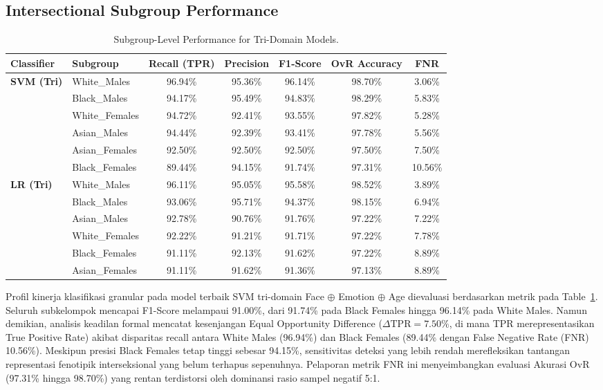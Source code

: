 \subsection{Intersectional Subgroup Performance}
\label{sec:subgroup_performance}

\begin{table}[htbp]
\caption{Subgroup-Level Performance for Tri-Domain Models.}
\label{tab:XI}
\centering
\begin{tabular}{llccccc}
\toprule
Classifier & Subgroup & Recall (TPR) & Precision & F1-Score & OvR Accuracy & FNR \\
\midrule
\multirow{6}{*}{\textbf{SVM (Tri)}} & White\_Males & 96.94\% & 95.36\% & 96.14\% & 98.70\% & 3.06\% \\
 & Black\_Males & 94.17\% & 95.49\% & 94.83\% & 98.29\% & 5.83\% \\
 & White\_Females & 94.72\% & 92.41\% & 93.55\% & 97.82\% & 5.28\% \\
 & Asian\_Males & 94.44\% & 92.39\% & 93.41\% & 97.78\% & 5.56\% \\
 & Asian\_Females & 92.50\% & 92.50\% & 92.50\% & 97.50\% & 7.50\% \\
 & Black\_Females & 89.44\% & 94.15\% & 91.74\% & 97.31\% & 10.56\% \\
\midrule
\multirow{6}{*}{\textbf{LR (Tri)}} & White\_Males & 96.11\% & 95.05\% & 95.58\% & 98.52\% & 3.89\% \\
 & Black\_Males & 93.06\% & 95.71\% & 94.37\% & 98.15\% & 6.94\% \\
 & Asian\_Males & 92.78\% & 90.76\% & 91.76\% & 97.22\% & 7.22\% \\
 & White\_Females & 92.22\% & 91.21\% & 91.71\% & 97.22\% & 7.78\% \\
 & Black\_Females & 91.11\% & 92.13\% & 91.62\% & 97.22\% & 8.89\% \\
 & Asian\_Females & 91.11\% & 91.62\% & 91.36\% & 97.13\% & 8.89\% \\
\bottomrule
\end{tabular}
\end{table}

Profil kinerja klasifikasi granular pada model terbaik SVM tri-domain Face $\oplus$ Emotion $\oplus$ Age dievaluasi berdasarkan metrik pada Table~\ref{tab:XI}. Seluruh subkelompok mencapai F1-Score melampaui 91.00\%, dari 91.74\% pada Black Females hingga 96.14\% pada White Males. Namun demikian, analisis keadilan formal mencatat kesenjangan Equal Opportunity Difference ($\Delta\text{TPR} = 7.50\%$, di mana TPR merepresentasikan True Positive Rate) akibat disparitas recall antara White Males (96.94\%) dan Black Females (89.44\% dengan False Negative Rate (FNR) 10.56\%). Meskipun presisi Black Females tetap tinggi sebesar 94.15\%, sensitivitas deteksi yang lebih rendah merefleksikan tantangan representasi fenotipik interseksional yang belum terhapus sepenuhnya. Pelaporan metrik FNR ini menyeimbangkan evaluasi Akurasi OvR (97.31\% hingga 98.70\%) yang rentan terdistorsi oleh dominansi rasio sampel negatif 5:1.

